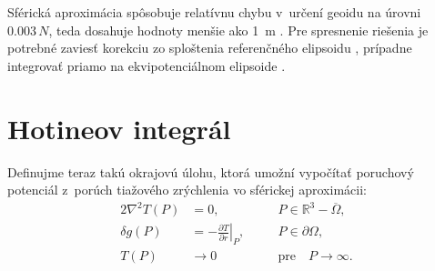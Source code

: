 \documentclass[a4paper, 12pt]{book}
\begin{document}
Sférická aproximácia spôsobuje relatívnu chybu v~určení geoidu na úrovni~$0.003 
\, N$, teda dosahuje hodnoty menšie ako 1~m \parencite{MoritzPhysicalGeodesy}.  
Pre spresnenie riešenia je potrebné zaviesť korekciu zo sploštenia referenčného 
elipsoidu \parencite{Claessens2006}, prípadne integrovať priamo na 
ekvipotenciálnom elipsoide \parencite{Martinec1997}.


\section{Hotineov integrál}
\label{sec:hotine_integral}

Definujme teraz takú okrajovú úlohu, ktorá umožní vypočítať poruchový potenciál 
z~porúch tiažového zrýchlenia vo sférickej aproximácii:
%
\begin{alignat}{2}
\nabla^2 T(P) &= 0{,} &&P \in \mathbb{R}^3 
- \overline\Omega{,}\label{eq:bvp_dg_laplace}\\
\delta g(P) &= -\left.\frac{\partial T}{\partial r}\right|_P{,} \quad &&P \in 
\partial\Omega{,}\label{eq:bvp_dg_boundary_condition}\\
T(P) &\rightarrow 0 &&\textrm{pre} \quad P \rightarrow 
\infty{.}\label{eq:bvp_dg_t_infty}
\end{alignat}
\end{document}
